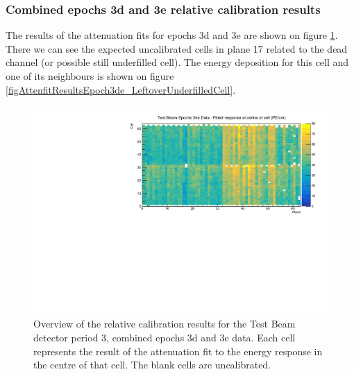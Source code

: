 \documentclass[12pt,a4paper]{article}
\begin{document}
\subsubsection*{Combined epochs 3d and 3e relative calibration results}

The results of the attenuation fits for epochs 3d and 3e are shown on figure \ref{figCellCentreResponseEp3de}. There we can see the expected uncalibrated cells in plane 17 related to the dead channel (or possible still underfilled cell). The energy deposition for this cell and one of its neighbours is shown on figure \ref{figAttenfitResultsEpoch3de_LeftoverUnderfilledCell}.

\begin{figure}[!hbtp]
\centering
\includegraphics[width=\textwidth]{Plots/CellResponseAtCentre_epoch3de_Limited.pdf}
\caption{Overview of the relative calibration results for the Test Beam detector period 3, combined epochs 3d and 3e data. Each cell represents the result of the attenuation fit to the energy response in the centre of that cell. The blank cells are uncalibrated.}
\label{figCellCentreResponseEp3de}
\end{figure}
\end{document}
